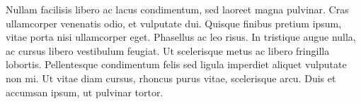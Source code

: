 Nullam facilisis libero ac lacus condimentum, sed laoreet magna pulvinar. Cras ullamcorper venenatis odio, et vulputate dui. Quisque finibus pretium ipsum, vitae porta nisi ullamcorper eget. Phasellus ac leo risus. In tristique augue nulla, ac cursus libero vestibulum feugiat. Ut scelerisque metus ac libero fringilla lobortis. Pellentesque condimentum felis sed ligula imperdiet aliquet vulputate non mi. Ut vitae diam cursus, rhoncus purus vitae, scelerisque arcu. Duis et accumsan ipsum, ut pulvinar tortor. 